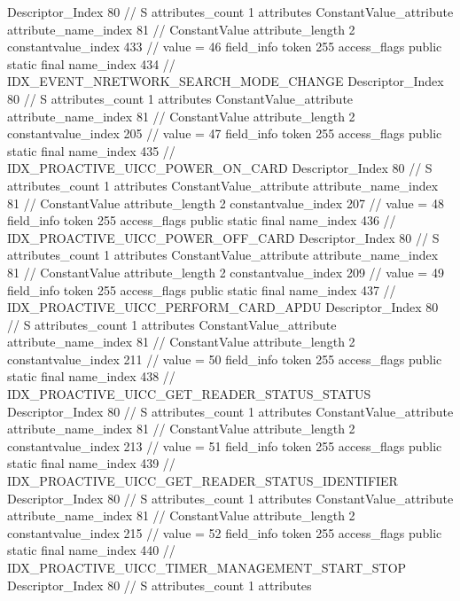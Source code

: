 {{{{{				Descriptor_Index	80		// S
				attributes_count	1
				attributes {
				ConstantValue_attribute {
					attribute_name_index	81		// ConstantValue
					attribute_length	2
					constantvalue_index	433		// value = 46
				}
				}
			}
			field_info {
				token	255
				access_flags	public static final
				name_index	434		// IDX_EVENT_NRETWORK_SEARCH_MODE_CHANGE
				Descriptor_Index	80		// S
				attributes_count	1
				attributes {
				ConstantValue_attribute {
					attribute_name_index	81		// ConstantValue
					attribute_length	2
					constantvalue_index	205		// value = 47
				}
				}
			}
			field_info {
				token	255
				access_flags	public static final
				name_index	435		// IDX_PROACTIVE_UICC_POWER_ON_CARD
				Descriptor_Index	80		// S
				attributes_count	1
				attributes {
				ConstantValue_attribute {
					attribute_name_index	81		// ConstantValue
					attribute_length	2
					constantvalue_index	207		// value = 48
				}
				}
			}
			field_info {
				token	255
				access_flags	public static final
				name_index	436		// IDX_PROACTIVE_UICC_POWER_OFF_CARD
				Descriptor_Index	80		// S
				attributes_count	1
				attributes {
				ConstantValue_attribute {
					attribute_name_index	81		// ConstantValue
					attribute_length	2
					constantvalue_index	209		// value = 49
				}
				}
			}
			field_info {
				token	255
				access_flags	public static final
				name_index	437		// IDX_PROACTIVE_UICC_PERFORM_CARD_APDU
				Descriptor_Index	80		// S
				attributes_count	1
				attributes {
				ConstantValue_attribute {
					attribute_name_index	81		// ConstantValue
					attribute_length	2
					constantvalue_index	211		// value = 50
				}
				}
			}
			field_info {
				token	255
				access_flags	public static final
				name_index	438		// IDX_PROACTIVE_UICC_GET_READER_STATUS_STATUS
				Descriptor_Index	80		// S
				attributes_count	1
				attributes {
				ConstantValue_attribute {
					attribute_name_index	81		// ConstantValue
					attribute_length	2
					constantvalue_index	213		// value = 51
				}
				}
			}
			field_info {
				token	255
				access_flags	public static final
				name_index	439		// IDX_PROACTIVE_UICC_GET_READER_STATUS_IDENTIFIER
				Descriptor_Index	80		// S
				attributes_count	1
				attributes {
				ConstantValue_attribute {
					attribute_name_index	81		// ConstantValue
					attribute_length	2
					constantvalue_index	215		// value = 52
				}
				}
			}
			field_info {
				token	255
				access_flags	public static final
				name_index	440		// IDX_PROACTIVE_UICC_TIMER_MANAGEMENT_START_STOP
				Descriptor_Index	80		// S
				attributes_count	1
				attributes {
}}}}}}
